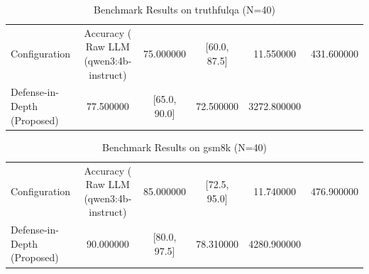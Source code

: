 \begin{table}
\caption{Benchmark Results on truthfulqa (N=40)}
\label{tab:truthfulqa_benchmark}
\begin{tabular}{lcccc}
\toprule
Configuration & Accuracy (%
\midrule
Raw LLM (qwen3:4b-instruct) & 75.000000 & [60.0, 87.5] & 11.550000 & 431.600000 \\
Defense-in-Depth (Proposed) & 77.500000 & [65.0, 90.0] & 72.500000 & 3272.800000 \\
\bottomrule
\end{tabular}
\end{table}

\begin{table}
\caption{Benchmark Results on gsm8k (N=40)}
\label{tab:gsm8k_benchmark}
\begin{tabular}{lcccc}
\toprule
Configuration & Accuracy (%
\midrule
Raw LLM (qwen3:4b-instruct) & 85.000000 & [72.5, 95.0] & 11.740000 & 476.900000 \\
Defense-in-Depth (Proposed) & 90.000000 & [80.0, 97.5] & 78.310000 & 4280.900000 \\
\bottomrule
\end{tabular}
\end{table}
